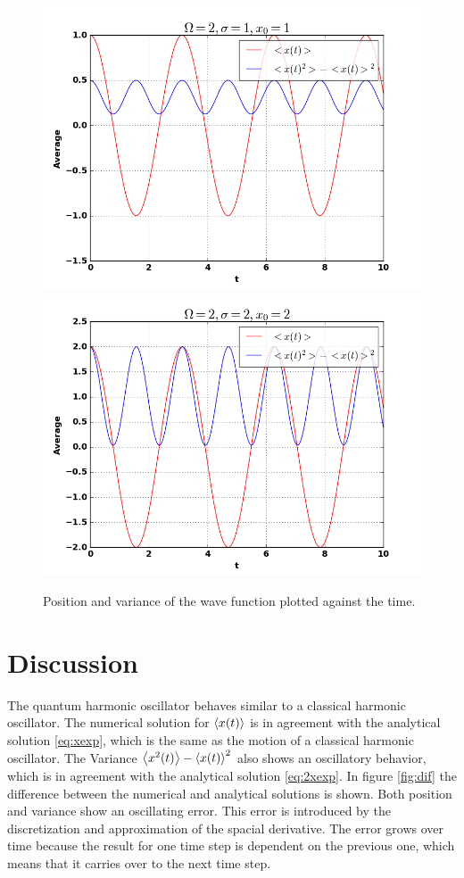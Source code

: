 \documentclass[12pt,a4paper]{article}
\begin{document}
\begin{figure}
\includegraphics[scale=0.4]{Bilder/211_av.png}
\includegraphics[scale=0.4]{Bilder/222_av.png}
\caption{Position and variance of the wave function plotted against the time.}
\label{fig:av}
\end{figure}


\section{Discussion}
The quantum harmonic oscillator behaves similar to a classical harmonic oscillator. The numerical solution for $\expval{x(t)}$ is in agreement with the analytical solution \ref{eq:xexp}, which is the same as the motion of a classical harmonic oscillator. The Variance $\expval{x^2(t)} - \expval{x(t)}^2$ also shows an oscillatory behavior, which is in agreement with the analytical solution \ref{eq:2xexp}. In figure \ref{fig:dif} the difference between the numerical and analytical solutions is shown. Both position and variance show an oscillating error. This error is introduced by the discretization and approximation of the spacial derivative. The error grows over time because the result for one time step is dependent on the previous one, which means that it carries over to the next time step.
\end{document}
